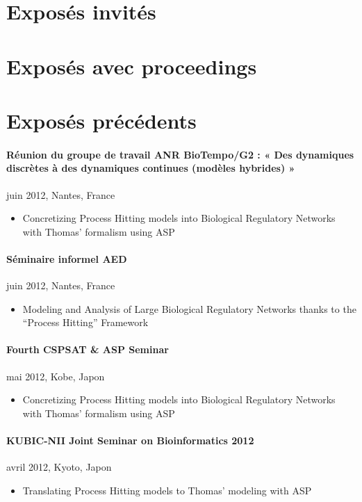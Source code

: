 \section{Exposés invités}

\section{Exposés avec proceedings}


\section{Exposés précédents}

\paragraph{Réunion du groupe de travail ANR BioTempo/G2 : « Des dynamiques discrètes à des dynamiques continues (modèles hybrides) »}
juin 2012, Nantes, France
\begin{itemize}
\item[] Concretizing Process Hitting models into Biological Regulatory Networks with Thomas' formalism using ASP
\end{itemize}

\paragraph{Séminaire informel AED}
juin 2012, Nantes, France
\begin{itemize}
\item[] Modeling and Analysis of Large Biological Regulatory Networks thanks to the “Process Hitting” Framework
\end{itemize}

\paragraph{Fourth CSPSAT \& ASP Seminar}
mai 2012, Kobe, Japon
\begin{itemize}
\item[] Concretizing Process Hitting models into Biological Regulatory Networks with Thomas' formalism using ASP
\end{itemize}

\paragraph{KUBIC-NII Joint Seminar on Bioinformatics 2012}
avril 2012, Kyoto, Japon
\begin{itemize}
\item[] Translating Process Hitting models to Thomas' modeling with ASP
\end{itemize}

